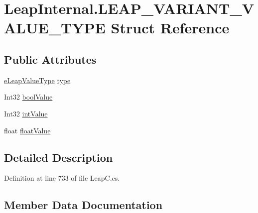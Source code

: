 \hypertarget{struct_leap_internal_1_1_l_e_a_p___v_a_r_i_a_n_t___v_a_l_u_e___t_y_p_e}{}\section{Leap\+Internal.\+L\+E\+A\+P\+\_\+\+V\+A\+R\+I\+A\+N\+T\+\_\+\+V\+A\+L\+U\+E\+\_\+\+T\+Y\+PE Struct Reference}
\label{struct_leap_internal_1_1_l_e_a_p___v_a_r_i_a_n_t___v_a_l_u_e___t_y_p_e}
\subsection*{Public Attributes}
\begin{DoxyCompactItemize}
\item 
\mbox{\hyperlink{namespace_leap_internal_a9c15e305893cd05c1ec6d65cea48737c}{e\+Leap\+Value\+Type}} \mbox{\hyperlink{struct_leap_internal_1_1_l_e_a_p___v_a_r_i_a_n_t___v_a_l_u_e___t_y_p_e_ab4c9f740dd9cc7cc6bf795d311556309}{type}}
\item 
Int32 \mbox{\hyperlink{struct_leap_internal_1_1_l_e_a_p___v_a_r_i_a_n_t___v_a_l_u_e___t_y_p_e_a1a85f425ec01e199ca44e5e29bb3f911}{bool\+Value}}
\item 
Int32 \mbox{\hyperlink{struct_leap_internal_1_1_l_e_a_p___v_a_r_i_a_n_t___v_a_l_u_e___t_y_p_e_a1cd6596da108e9eaf9f730a34437a0ce}{int\+Value}}
\item 
float \mbox{\hyperlink{struct_leap_internal_1_1_l_e_a_p___v_a_r_i_a_n_t___v_a_l_u_e___t_y_p_e_a443746a02e2cc75f23ad909549c1523a}{float\+Value}}
\end{DoxyCompactItemize}


\subsection{Detailed Description}


Definition at line 733 of file Leap\+C.\+cs.



\subsection{Member Data Documentation}
\mbox{\label{struct_leap_internal_1_1_l_e_a_p___v_a_r_i_a_n_t___v_a_l_u_e___t_y_p_e_a1a85f425ec01e199ca44e5e29bb3f911}} 
